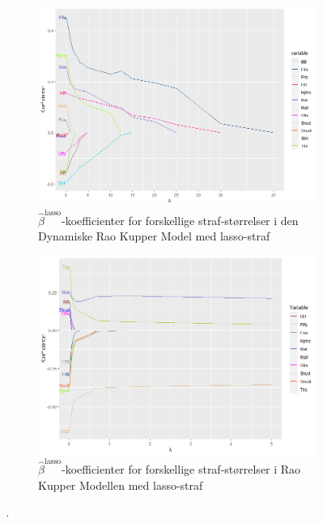 \documentclass[11pt,a4paper]{article}
\begin{document}
\begin{figure}[h!]
  \centering
  \begin{subfigure}[b]{0.425\linewidth}
    \includegraphics[width=\textwidth]{Beta_Lasso_GrimFarve.png}
    \caption{$\hat{\beta}^{\text{lasso}}$-koefficienter for forskellige straf-størrelser i den Dynamiske Rao Kupper Model med lasso-straf}
    \label{fig:DBetaLasso}
  \end{subfigure}
  \begin{subfigure}[b]{0.425\linewidth}
    \includegraphics[width=\textwidth]{SKL2.png}
    \caption{$\hat{\beta}^{\text{lasso}}$-koefficienter for forskellige straf-størrelser i Rao Kupper Modellen med lasso-straf}
    \label{fig:StatiskLine}
  \end{subfigure}
\caption{\textit{.}}
  \label{fig:xxxx}
\end{figure}
\end{document}
